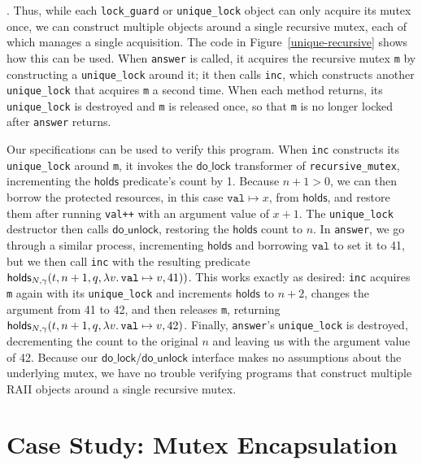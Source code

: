 \documentclass[acmsmall,screen,review,anonymous]{acmart}
\begin{document}
. Thus, while each \lstinline{lock_guard} or \lstinline{unique_lock} object can only acquire its mutex once, we can construct multiple objects around a single recursive mutex, each of which manages a single acquisition.
The code in Figure~\ref{unique-recursive} shows how this can be used. When \lstinline{answer} is called, it acquires the recursive mutex \lstinline{m} by constructing a \lstinline{unique_lock} around it; it then calls \lstinline{inc}, which constructs another \lstinline{unique_lock} that acquires \lstinline{m} a second time. When each method returns, its \lstinline{unique_lock} is destroyed and \lstinline{m} is released once, so that \lstinline{m} is no longer locked after \lstinline{answer} returns.

Our specifications can be used to verify this program. When \lstinline{inc} constructs its \lstinline{unique_lock} around \lstinline{m}, it invokes the $\mathsf{do\_lock}$ transformer of \lstinline{recursive_mutex}, incrementing the $\mathsf{holds}$ predicate's count by 1. Because $n + 1 > 0$, we can then borrow the protected resources, in this case $\texttt{val} \mapsto x$, from $\mathsf{holds}$, and restore them after running \lstinline{val++} with an argument value of $x + 1$. The \lstinline{unique_lock} destructor then calls $\mathsf{do\_unlock}$, restoring the $\mathsf{holds}$ count to $n$. In \lstinline{answer}, we go through a similar process, incrementing $\mathsf{holds}$ and borrowing $\texttt{val}$ to set it to 41, but we then call \lstinline{inc} with the resulting predicate $\acquirable{N, \gamma}{t}{n+1}{q}{\lambda v.\,\texttt{val} \mapsto v}{41})$. This works exactly as desired: \lstinline{inc} acquires \lstinline{m} again with its \lstinline{unique_lock} and increments $\mathsf{holds}$ to $n + 2$, changes the argument from 41 to 42, and then releases \lstinline{m}, returning $\acquirable{N, \gamma}{t}{n+1}{q}{\lambda v.\,\texttt{val} \mapsto v}{42}$. Finally, \lstinline{answer}'s \lstinline{unique_lock} is destroyed, decrementing the count to the original $n$ and leaving us with the argument value of 42. Because our $\mathsf{do\_lock}$/$\mathsf{do\_unlock}$ interface makes no assumptions about the underlying mutex, we have no trouble verifying programs that construct multiple RAII objects around a single recursive mutex.

\section{Case Study: Mutex Encapsulation}
%
\end{document}
